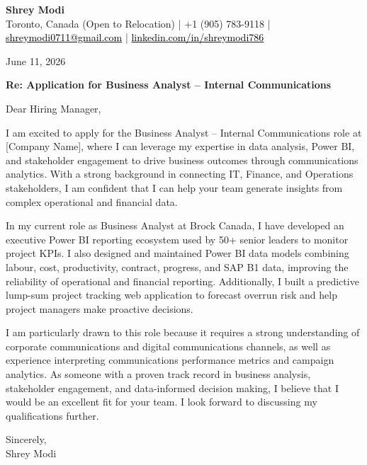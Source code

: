 \documentclass[11pt,letterpaper]{article}
\begin{document}
\begin{center}
  {\Large \bfseries \color{accent} Shrey Modi}\\[0.2em]
  {\small
    Toronto, Canada (Open to Relocation)
 | +1 (905) 783-9118 | \href{mailto:shreymodi0711@gmail.com}{\textcolor{black}{shreymodi0711@gmail.com}} | \href{https://linkedin.com/in/shreymodi786}{\textcolor{black}{linkedin.com/in/shreymodi786}}  }
\end{center}

\vspace{1em}

June 11, 2026

\vspace{0.5em}


\vspace{0.5em}

\textbf{Re: Application for Business Analyst – Internal Communications}

Dear Hiring Manager,

I am excited to apply for the Business Analyst – Internal Communications role at [Company Name], where I can leverage my expertise in data analysis, Power BI, and stakeholder engagement to drive business outcomes through communications analytics. With a strong background in connecting IT, Finance, and Operations stakeholders, I am confident that I can help your team generate insights from complex operational and financial data.

In my current role as Business Analyst at Brock Canada, I have developed an executive Power BI reporting ecosystem used by 50+ senior leaders to monitor project KPIs. I also designed and maintained Power BI data models combining labour, cost, productivity, contract, progress, and SAP B1 data, improving the reliability of operational and financial reporting. Additionally, I built a predictive lump-sum project tracking web application to forecast overrun risk and help project managers make proactive decisions.

I am particularly drawn to this role because it requires a strong understanding of corporate communications and digital communications channels, as well as experience interpreting communications performance metrics and campaign analytics. As someone with a proven track record in business analysis, stakeholder engagement, and data-informed decision making, I believe that I would be an excellent fit for your team. I look forward to discussing my qualifications further.

Sincerely,\\
Shrey Modi
\end{document}
